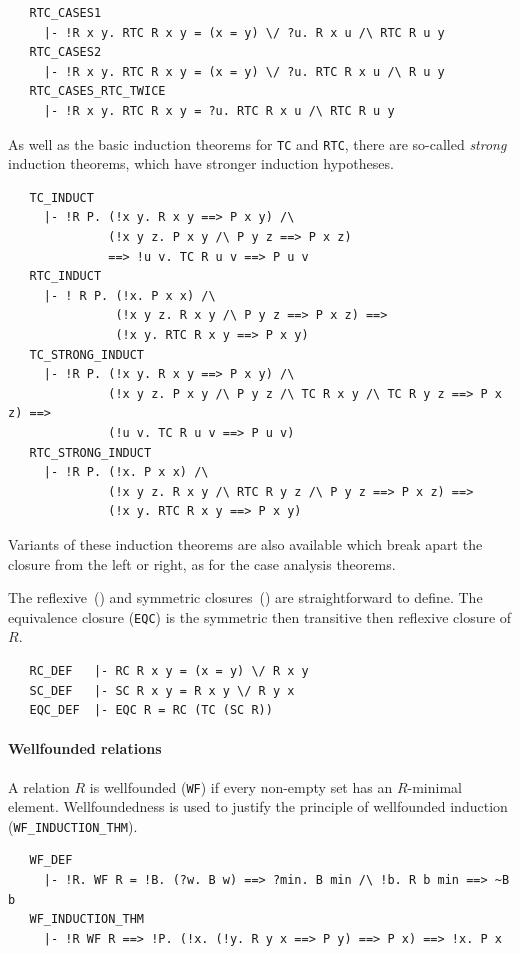 {\begin{hol}
\begin{verbatim}
   RTC_CASES1
     |- !R x y. RTC R x y = (x = y) \/ ?u. R x u /\ RTC R u y
   RTC_CASES2
     |- !R x y. RTC R x y = (x = y) \/ ?u. RTC R x u /\ R u y
   RTC_CASES_RTC_TWICE
     |- !R x y. RTC R x y = ?u. RTC R x u /\ RTC R u y
\end{verbatim}
\end{hol}

As well as the basic induction theorems for {\small\verb+TC+} and
{\small\verb+RTC+}, there are so-called \emph{strong} induction
theorems, which have stronger induction hypotheses.
%
\begin{hol}
\begin{verbatim}
   TC_INDUCT
     |- !R P. (!x y. R x y ==> P x y) /\
              (!x y z. P x y /\ P y z ==> P x z)
              ==> !u v. TC R u v ==> P u v
   RTC_INDUCT
     |- ! R P. (!x. P x x) /\
               (!x y z. R x y /\ P y z ==> P x z) ==>
               (!x y. RTC R x y ==> P x y)
   TC_STRONG_INDUCT
     |- !R P. (!x y. R x y ==> P x y) /\
              (!x y z. P x y /\ P y z /\ TC R x y /\ TC R y z ==> P x z) ==>
              (!u v. TC R u v ==> P u v)
   RTC_STRONG_INDUCT
     |- !R P. (!x. P x x) /\
              (!x y z. R x y /\ RTC R y z /\ P y z ==> P x z) ==>
              (!x y. RTC R x y ==> P x y)
\end{verbatim}
\end{hol}
Variants of these induction theorems are also available which break
apart the closure from the left or right, as for the case analysis theorems.

\medskip

The reflexive~(\holtxt{RC}) and symmetric closures~(\holtxt{SC}) are
straightforward to define. The equivalence closure
({\small\verb+EQC+}) is the symmetric then transitive then reflexive
closure of $R$.
%
\begin{hol}
\begin{verbatim}
   RC_DEF   |- RC R x y = (x = y) \/ R x y
   SC_DEF   |- SC R x y = R x y \/ R y x
   EQC_DEF  |- EQC R = RC (TC (SC R))
\end{verbatim}
\end{hol}

\paragraph {Wellfounded relations}

A relation $R$ is wellfounded ({\small\verb+WF+}) if every non-empty set
has an $R$-minimal element. Wellfoundedness is used to justify the
principle of wellfounded induction ({\small\verb+WF_INDUCTION_THM+}).
%
\begin{hol}
\begin{verbatim}
   WF_DEF
     |- !R. WF R = !B. (?w. B w) ==> ?min. B min /\ !b. R b min ==> ~B b
   WF_INDUCTION_THM
     |- !R WF R ==> !P. (!x. (!y. R y x ==> P y) ==> P x) ==> !x. P x
\end{verbatim}
\end{hol}

}
